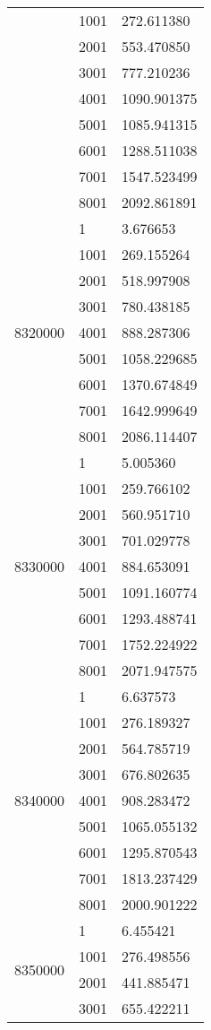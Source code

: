 \begin{table}[htb!]
\begin{tabular}{lll}
 & 1001 & 272.611380 \\
 & 2001 & 553.470850 \\
 & 3001 & 777.210236 \\
 & 4001 & 1090.901375 \\
 & 5001 & 1085.941315 \\
 & 6001 & 1288.511038 \\
 & 7001 & 1547.523499 \\
 & 8001 & 2092.861891 \\
\multirow[c]{9}{*}{8320000} & 1 & 3.676653 \\
 & 1001 & 269.155264 \\
 & 2001 & 518.997908 \\
 & 3001 & 780.438185 \\
 & 4001 & 888.287306 \\
 & 5001 & 1058.229685 \\
 & 6001 & 1370.674849 \\
 & 7001 & 1642.999649 \\
 & 8001 & 2086.114407 \\
\multirow[c]{9}{*}{8330000} & 1 & 5.005360 \\
 & 1001 & 259.766102 \\
 & 2001 & 560.951710 \\
 & 3001 & 701.029778 \\
 & 4001 & 884.653091 \\
 & 5001 & 1091.160774 \\
 & 6001 & 1293.488741 \\
 & 7001 & 1752.224922 \\
 & 8001 & 2071.947575 \\
\multirow[c]{9}{*}{8340000} & 1 & 6.637573 \\
 & 1001 & 276.189327 \\
 & 2001 & 564.785719 \\
 & 3001 & 676.802635 \\
 & 4001 & 908.283472 \\
 & 5001 & 1065.055132 \\
 & 6001 & 1295.870543 \\
 & 7001 & 1813.237429 \\
 & 8001 & 2000.901222 \\
\multirow[c]{9}{*}{8350000} & 1 & 6.455421 \\
 & 1001 & 276.498556 \\
 & 2001 & 441.885471 \\
 & 3001 & 655.422211 \\

\end{tabular}
\end{table}

